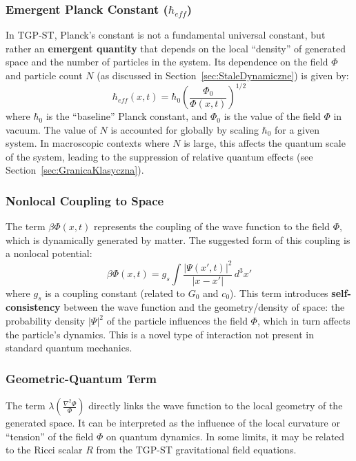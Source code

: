 \documentclass[11pt,a4paper]{article}
\begin{document}
\subsubsection{Emergent Planck Constant ($\hbar_{eff}$)}
In TGP-ST, Planck's constant is not a fundamental universal constant, but rather an \textbf{emergent quantity} that depends on the local “density” of generated space and the number of particles in the system. Its dependence on the field $\Phi$ and particle count $N$ (as discussed in Section~\ref{sec:StaleDynamiczne}) is given by:
\begin{equation}
    \hbar_{eff}(x,t) = \hbar_0 \left(\frac{\Phi_0}{\Phi(x,t)}\right)^{1/2}
    \label{eq:h_eff}
\end{equation}
where $\hbar_0$ is the “baseline” Planck constant, and $\Phi_0$ is the value of the field $\Phi$ in vacuum. The value of $N$ is accounted for globally by scaling $\hbar_0$ for a given system. In macroscopic contexts where $N$ is large, this affects the quantum scale of the system, leading to the suppression of relative quantum effects (see Section~\ref{sec:GranicaKlasyczna}).

\subsubsection{Nonlocal Coupling to Space}
The term $\beta\Phi(x,t)$ represents the coupling of the wave function to the field $\Phi$, which is dynamically generated by matter. The suggested form of this coupling is a nonlocal potential:
\begin{equation}
    \beta\Phi(x,t) = g_s\int \frac{|\Psi(x',t)|^2}{|x-x'|} \, d^3x'
    \label{eq:NonlocalCoupling}
\end{equation}
where $g_s$ is a coupling constant (related to $G_0$ and $c_0$). This term introduces \textbf{self-consistency} between the wave function and the geometry/density of space: the probability density $|\Psi|^2$ of the particle influences the field $\Phi$, which in turn affects the particle’s dynamics. This is a novel type of interaction not present in standard quantum mechanics.

\subsubsection{Geometric-Quantum Term}
The term $\lambda\left(\frac{\nabla^2\Phi}{\Phi}\right)$ directly links the wave function to the local geometry of the generated space. It can be interpreted as the influence of the local curvature or “tension” of the field $\Phi$ on quantum dynamics. In some limits, it may be related to the Ricci scalar $R$ from the TGP-ST gravitational field equations.
\end{document}

